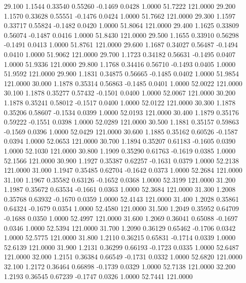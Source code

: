   29.100   1.1544   0.33540   0.55260  -0.1469   0.0428   1.0000  51.7222 121.0000
  29.200   1.1570   0.33628   0.55551  -0.1476   0.0424   1.0000  51.7662 121.0000
  29.300   1.1597   0.33717   0.55824  -0.1482   0.0420   1.0000  51.8064 121.0000
  29.400   1.1625   0.33809   0.56074  -0.1487   0.0416   1.0000  51.8430 121.0000
  29.500   1.1655   0.33910   0.56298  -0.1491   0.0413   1.0000  51.8761 121.0000
  29.600   1.1687   0.34027   0.56487  -0.1494   0.0410   1.0000  51.9062 121.0000
  29.700   1.1723   0.34182   0.56631  -0.1495   0.0407   1.0000  51.9336 121.0000
  29.800   1.1768   0.34416   0.56710  -0.1493   0.0405   1.0000  51.9592 121.0000
  29.900   1.1831   0.34875   0.56665  -0.1485   0.0402   1.0000  51.9854 121.0000
  30.000   1.1878   0.35314   0.56863  -0.1485   0.0401   1.0000  52.0022 121.0000
  30.100   1.1878   0.35277   0.57432  -0.1501   0.0400   1.0000  52.0067 121.0000
  30.200   1.1878   0.35241   0.58012  -0.1517   0.0400   1.0000  52.0122 121.0000
  30.300   1.1878   0.35206   0.58607  -0.1534   0.0399   1.0000  52.0193 121.0000
  30.400   1.1879   0.35176   0.59222  -0.1551   0.0398   1.0000  52.0289 121.0000
  30.500   1.1881   0.35157   0.59863  -0.1569   0.0396   1.0000  52.0429 121.0000
  30.600   1.1885   0.35162   0.60526  -0.1587   0.0394   1.0000  52.0653 121.0000
  30.700   1.1894   0.35207   0.61183  -0.1605   0.0390   1.0000  52.1030 121.0000
  30.800   1.1909   0.35290   0.61763  -0.1619   0.0385   1.0000  52.1566 121.0000
  30.900   1.1927   0.35387   0.62257  -0.1631   0.0379   1.0000  52.2138 121.0000
  31.000   1.1947   0.35485   0.62704  -0.1642   0.0373   1.0000  52.2684 121.0000
  31.100   1.1967   0.35582   0.63126  -0.1652   0.0368   1.0000  52.3199 121.0000
  31.200   1.1987   0.35672   0.63534  -0.1661   0.0363   1.0000  52.3684 121.0000
  31.300   1.2008   0.35768   0.63932  -0.1670   0.0359   1.0000  52.4143 121.0000
  31.400   1.2028   0.35861   0.64324  -0.1679   0.0354   1.0000  52.4580 121.0000
  31.500   1.2049   0.35952   0.64709  -0.1688   0.0350   1.0000  52.4997 121.0000
  31.600   1.2069   0.36041   0.65088  -0.1697   0.0346   1.0000  52.5394 121.0000
  31.700   1.2090   0.36129   0.65462  -0.1706   0.0342   1.0000  52.5775 121.0000
  31.800   1.2110   0.36215   0.65831  -0.1714   0.0339   1.0000  52.6139 121.0000
  31.900   1.2131   0.36299   0.66193  -0.1723   0.0335   1.0000  52.6487 121.0000
  32.000   1.2151   0.36384   0.66549  -0.1731   0.0332   1.0000  52.6820 121.0000
  32.100   1.2172   0.36464   0.66898  -0.1739   0.0329   1.0000  52.7138 121.0000
  32.200   1.2193   0.36545   0.67239  -0.1747   0.0326   1.0000  52.7441 121.0000
